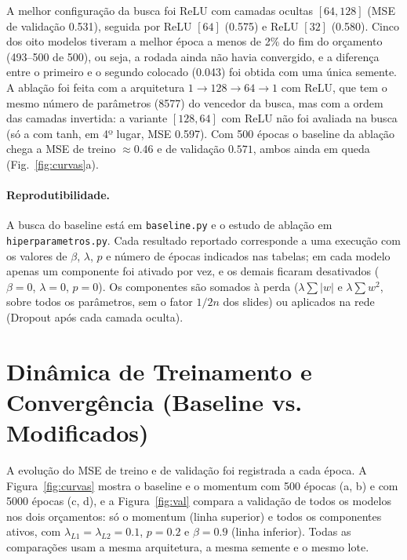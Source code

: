 \documentclass[11pt,a4paper]{article}
\begin{document}
A melhor configuração da busca foi ReLU com camadas ocultas $[64,128]$ (MSE de validação 0.531), seguida por ReLU $[64]$ (0.575) e ReLU $[32]$ (0.580). Cinco dos oito modelos tiveram a melhor época a menos de 2\% do fim do orçamento (493--500 de 500), ou seja, a rodada ainda não havia convergido, e a diferença entre o primeiro e o segundo colocado (0.043) foi obtida com uma única semente. A ablação foi feita com a arquitetura $1\to128\to64\to1$ com ReLU, que tem o mesmo número de parâmetros (8577) do vencedor da busca, mas com a ordem das camadas invertida: a variante $[128,64]$ com ReLU não foi avaliada na busca (só a com tanh, em 4º lugar, MSE 0.597). Com 500 épocas o baseline da ablação chega a MSE de treino $\approx0.46$ e de validação $0.571$, ambos ainda em queda (Fig.~\ref{fig:curvas}a).

\paragraph{Reprodutibilidade.} A busca do baseline está em \texttt{baseline.py} e o estudo de ablação em \texttt{hiperparametros.py}. Cada resultado reportado corresponde a uma execução com os valores de $\beta$, $\lambda$, $p$ e número de épocas indicados nas tabelas; em cada modelo apenas um componente foi ativado por vez, e os demais ficaram desativados ($\beta=0$, $\lambda=0$, $p=0$). Os componentes são somados à perda ($\lambda\sum|w|$ e $\lambda\sum w^2$, sobre todos os parâmetros, sem o fator $1/2n$ dos slides) ou aplicados na rede (Dropout após cada camada oculta).

\section{Dinâmica de Treinamento e Convergência (Baseline vs. Modificados)}
A evolução do MSE de treino e de validação foi registrada a cada época. A Figura~\ref{fig:curvas} mostra o baseline e o momentum com 500 épocas (a, b) e com 5000 épocas (c, d), e a Figura~\ref{fig:val} compara a validação de todos os modelos nos dois orçamentos: só o momentum (linha superior) e todos os componentes ativos, com $\lambda_{L1}=\lambda_{L2}=0.1$, $p=0.2$ e $\beta=0.9$ (linha inferior). Todas as comparações usam a mesma arquitetura, a mesma semente e o mesmo lote.
\end{document}
